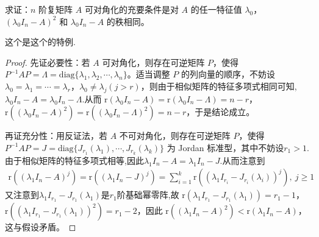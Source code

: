 \documentclass[../../main.tex]{subfiles}%
\begin{document}
\begin{proposition}\label{proposition:线性变换可对角化的代数充要条件2}
求证：$n$ 阶复矩阵 $A$ 可对角化的充要条件是对 $A$ 的任一特征值 $\lambda_0$，$(\lambda_0I_n - A)^2$ 和 $\lambda_0I_n - A$ 的秩相同。
\end{proposition}
\begin{remark}
这个是这个的特例.
\end{remark}
\begin{proof}

{\heiti 先证必要性：}若 $A$ 可对角化，则存在可逆矩阵 $P$，使得 $P^{-1}AP = \Lambda = \mathrm{diag}\{\lambda_1,\lambda_2,\cdots,\lambda_n\}$。适当调整 $P$ 的列向量的顺序，不妨设 $\lambda_0 = \lambda_1 = \cdots = \lambda_r$，$\lambda_0\neq\lambda_j (j > r)$，则由于相似矩阵的特征多项式相同可知,$\lambda_0I_n-A=\lambda_0I_n-\Lambda$.从而 $\mathrm{r}(\lambda_0I_n - A)=\mathrm{r}(\lambda_0I_n - \Lambda)=n - r$，$\mathrm{r}((\lambda_0I_n - A)^2)=\mathrm{r}((\lambda_0I_n - \Lambda)^2)=n - r$，于是结论成立。

{\heiti 再证充分性：}用反证法，若 $A$ 不可对角化，则存在可逆矩阵 $P$，使得 $P^{-1}AP = J = \mathrm{diag}\{J_{r_1}(\lambda_1),\cdots,J_{r_k}(\lambda_k)\}$ 为 Jordan 标准型，其中不妨设$r_1 > 1$.由于相似矩阵的特征多项式相等,因此$\lambda_1I_n-A=\lambda_1I_n-J$.从而注意到
\begin{align*}
\mathrm{r}((\lambda_1I_n - A)^j)=\mathrm{r}((\lambda_1I_n - J)^j)=\sum_{i = 1}^{k}\mathrm{r}((\lambda_1I_{r_i} - J_{r_i}(\lambda_i))^j),\ j\geqslant  1
\end{align*}
又注意到$\lambda_1I_{r_1}-J_{r_1}(\lambda_1)$是$r_1$阶基础幂零阵,故
$\mathrm{r}(\lambda_1I_{r_1} - J_{r_1}(\lambda_1))=r_1 - 1$，$\mathrm{r}((\lambda_1I_{r_1} - J_{r_1}(\lambda_1))^2)=r_1 - 2$，因此 $\mathrm{r}((\lambda_1I_n - A)^2)<\mathrm{r}(\lambda_1I_n - A)$，这与假设矛盾。

\end{proof}
\end{document}
